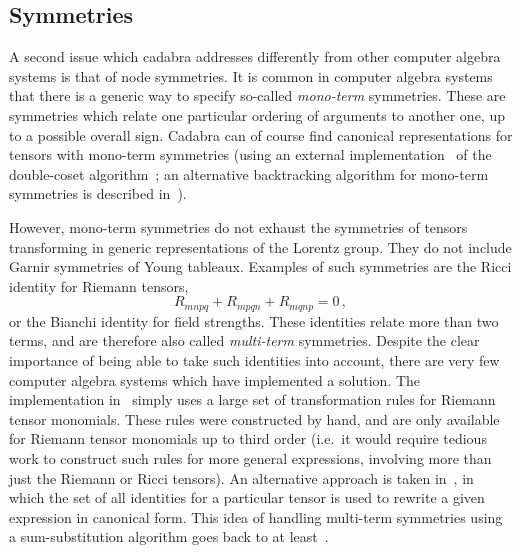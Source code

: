 \documentclass{elsart}
\begin{document}
\subsection{Symmetries}
\label{s:symmetries}

A second issue which cadabra addresses differently from other computer
algebra systems is that of node symmetries. It is common in computer
algebra systems that there is a generic way to specify so-called
\emph{mono-term} symmetries. These are symmetries which relate one
particular ordering of arguments to another one, up to a possible
overall sign. Cadabra can of course find canonical representations for
tensors with mono-term symmetries (using an external
implementation~\cite{e_xact} of the double-coset
algorithm~\cite{port2}; an alternative backtracking algorithm for
mono-term symmetries is described in~\cite{dres1}).

However, mono-term symmetries do not exhaust the symmetries of tensors
transforming in generic representations of the Lorentz group. They do
not include Garnir symmetries of Young tableaux. Examples of such
symmetries are the Ricci identity for Riemann tensors,
\begin{equation}
R_{m n p q} + R_{m p q n} + R_{m q n p} = 0\,,
\end{equation}
or the Bianchi identity for field strengths. These identities relate
more than two terms, and are therefore also called \emph{multi-term}
symmetries. Despite the clear importance of being able to take such
identities into account, there are very few computer algebra systems
which have implemented a solution. The implementation
in~\cite{parker1} simply uses a large set of transformation rules for
Riemann tensor monomials. These rules were constructed by hand, and
are only available for Riemann tensor monomials up to third order
(i.e.~it would require tedious work to construct such rules for more
general expressions, involving more than just the Riemann or Ricci
tensors). An alternative approach is taken
in~\cite{maccallum1,ilyi1,e_balf1}, in which the set of all identities
for a particular tensor is used to rewrite a given expression in
canonical form. This idea of handling multi-term symmetries using a
sum-substitution algorithm goes back to at least~\cite{hornf1}.
\end{document}
